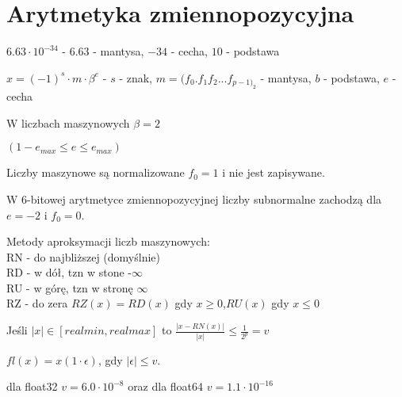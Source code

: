 \section{Arytmetyka zmiennopozycyjna}

\entry
$6.63 \cdot 10^{-34}$ - $6.63$ - mantysa, $-34$ - cecha, $10$ - podstawa

\entry
$x = (-1)^s \cdot m \cdot \beta^e$ - $s$ - znak, $m = (f_0.f_1f_2...f_{p-1)_2}$ - mantysa, $b$ - podstawa, $e$ - cecha

\entry
W liczbach maszynowych $\beta = 2$

\entry
$(1 - e_{max} \leq e \leq e_{max})$

\entry
Liczby maszynowe są normalizowane $f_0 = 1$ i nie jest zapisywane.

\entry
W 6-bitowej arytmetyce zmiennopozycyjnej liczby subnormalne zachodzą dla $e=-2$ i $f_0 = 0$.

\entry
Metody aproksymacji liczb maszynowych:\\
RN - do najbliższej (domyślnie)\\
RD - w dół, tzn w stone -$\infty$\\
RU - w górę, tzn w stronę $\infty$\\
RZ - do zera $RZ(x) = RD(x)$ gdy $x \geq 0$,$RU(x)$ gdy $x \leq 0$

\entry
Jeśli $|x| \in [realmin, realmax]$ to $\frac{|x - RN(x)|}{|x|} \leq \frac{1}{2^p} =v$

\entry 
$fl(x) = x (1 \cdot \epsilon)$, gdy $|\epsilon| \leq v$.

\entry dla float32 $v = 6.0 \cdot 10^{-8}$ oraz dla float64 $v = 1.1 \cdot 10^{-16}$
